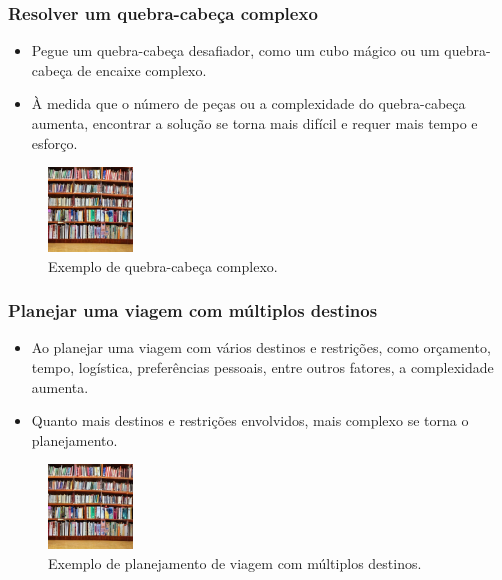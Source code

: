 \documentclass[12pt]{beamer}
\begin{document}
\begin{frame}
    \frametitle{Resolver um quebra-cabeça complexo}

    \begin{itemize}
        \item Pegue um quebra-cabeça desafiador, como um cubo mágico ou um quebra-cabeça de encaixe complexo.
        \item À medida que o número de peças ou a complexidade do quebra-cabeça aumenta, encontrar a solução se torna mais difícil e requer mais tempo e esforço.
    \end{itemize}

    \begin{figure}[htb]
        \centering
        \includegraphics[width=0.2\textwidth]{livros}
        \caption{Exemplo de quebra-cabeça complexo.}
        \label{fig:quebracabeca}
    \end{figure}
\end{frame}

\begin{frame}
    \frametitle{Planejar uma viagem com múltiplos destinos}

    \begin{itemize}
        \item Ao planejar uma viagem com vários destinos e restrições, como orçamento, tempo, logística, preferências pessoais, entre outros fatores, a complexidade aumenta.
        \item Quanto mais destinos e restrições envolvidos, mais complexo se torna o planejamento.
    \end{itemize}

    \begin{figure}[htb]
        \centering
        \includegraphics[width=0.2\textwidth]{livros}
        \caption{Exemplo de planejamento de viagem com múltiplos destinos.}
        \label{fig:viagem}
    \end{figure}
\end{frame}
\end{document}
